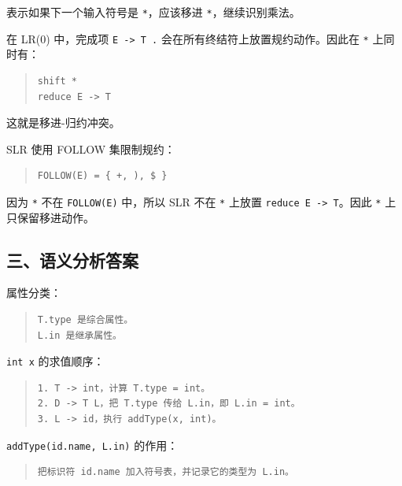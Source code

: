 \documentclass[UTF8,zihao=-4]{ctexart}
\begin{document}
表示如果下一个输入符号是 \texttt{*}，应该移进 \texttt{*}，继续识别乘法。

在 LR(0) 中，完成项 \texttt{E -> T .} 会在所有终结符上放置规约动作。因此在 \texttt{*} 上同时有：

\begin{quote}
\footnotesize
\begin{verbatim}
shift *
reduce E -> T
\end{verbatim}
\end{quote}

这就是移进-归约冲突。

SLR 使用 FOLLOW 集限制规约：

\begin{quote}
\footnotesize
\begin{verbatim}
FOLLOW(E) = { +, ), $ }
\end{verbatim}
\end{quote}

因为 \texttt{*} 不在 \texttt{FOLLOW(E)} 中，所以 SLR 不在 \texttt{*} 上放置 \texttt{reduce E -> T}。因此 \texttt{*} 上只保留移进动作。

\subsection*{三、语义分析答案}

属性分类：

\begin{quote}
\footnotesize
\begin{verbatim}
T.type 是综合属性。
L.in 是继承属性。
\end{verbatim}
\end{quote}

\texttt{int x} 的求值顺序：

\begin{quote}
\footnotesize
\begin{verbatim}
1. T -> int，计算 T.type = int。
2. D -> T L，把 T.type 传给 L.in，即 L.in = int。
3. L -> id，执行 addType(x, int)。
\end{verbatim}
\end{quote}

\texttt{addType(id.name, L.in)} 的作用：

\begin{quote}
\footnotesize
\begin{verbatim}
把标识符 id.name 加入符号表，并记录它的类型为 L.in。
\end{verbatim}
\end{quote}
\end{document}

